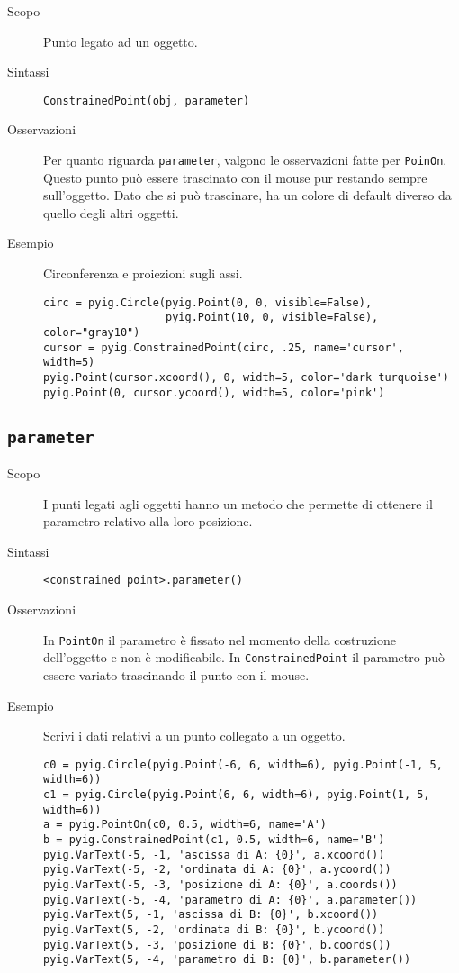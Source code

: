 \begin{description}
 \item [Scopo] Punto legato ad un oggetto.
 \item [Sintassi] \lstinline{ConstrainedPoint(obj, parameter)}
 \item [Osservazioni] Per quanto riguarda \lstinline{parameter}, valgono le 
osservazioni fatte per \lstinline{PoinOn}.
Questo punto può essere trascinato con il mouse pur restando sempre
sull'oggetto. Dato che si può trascinare, 
ha un colore di default diverso da quello degli altri oggetti.

 \item [Esempio] Circonferenza e proiezioni sugli assi.

\begin{lstlisting}
circ = pyig.Circle(pyig.Point(0, 0, visible=False),
                   pyig.Point(10, 0, visible=False), color="gray10")
cursor = pyig.ConstrainedPoint(circ, .25, name='cursor', width=5)
pyig.Point(cursor.xcoord(), 0, width=5, color='dark turquoise')
pyig.Point(0, cursor.ycoord(), width=5, color='pink')
\end{lstlisting}

\end{description}

\subsection{\lstinline{parameter}}
\label{sub:geoint_parameter}

\begin{description}
 \item [Scopo] I punti legati agli oggetti hanno un metodo che permette di 
ottenere il parametro relativo alla loro posizione.

 \item [Sintassi] \lstinline{<constrained point>.parameter()}
 \item [Osservazioni]
In \lstinline{PointOn} il parametro è fissato nel momento della costruzione
dell'oggetto e non è modificabile. In \lstinline{ConstrainedPoint} il parametro 
può essere variato trascinando il punto con il mouse.

 \item [Esempio] Scrivi i dati relativi a un punto collegato a un oggetto.

\begin{lstlisting}
c0 = pyig.Circle(pyig.Point(-6, 6, width=6), pyig.Point(-1, 5, width=6))
c1 = pyig.Circle(pyig.Point(6, 6, width=6), pyig.Point(1, 5, width=6))
a = pyig.PointOn(c0, 0.5, width=6, name='A')
b = pyig.ConstrainedPoint(c1, 0.5, width=6, name='B')
pyig.VarText(-5, -1, 'ascissa di A: {0}', a.xcoord())
pyig.VarText(-5, -2, 'ordinata di A: {0}', a.ycoord())
pyig.VarText(-5, -3, 'posizione di A: {0}', a.coords())
pyig.VarText(-5, -4, 'parametro di A: {0}', a.parameter())
pyig.VarText(5, -1, 'ascissa di B: {0}', b.xcoord())
pyig.VarText(5, -2, 'ordinata di B: {0}', b.ycoord())
pyig.VarText(5, -3, 'posizione di B: {0}', b.coords())
pyig.VarText(5, -4, 'parametro di B: {0}', b.parameter())
\end{lstlisting}

\end{description}


